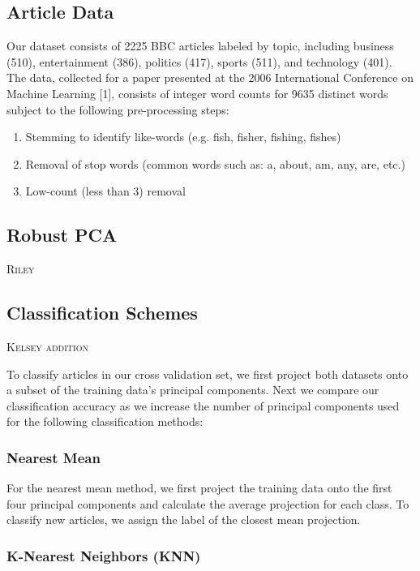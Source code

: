\documentclass[12pt]{article}
\newcommand{\comment}[1]{\textsc{\color[rgb]{1,0,0}#1}}
\begin{document}
\subsection{Article Data}

Our dataset consists of 2225 BBC articles labeled by topic, including business (510), entertainment (386), politics (417), sports (511), and technology (401). The data, collected for a paper presented at the 2006 International Conference on Machine Learning [1], consists of integer word counts for 9635 distinct words subject to the following pre-processing steps:
\begin{enumerate}
\item Stemming to identify like-words (e.g. fish, fisher, fishing, fishes)
\item Removal of stop words (common words such as: a, about, am, any, are, etc.)
\item Low-count (less than 3) removal
\end{enumerate}

\subsection{Robust PCA}
\comment{Riley}

\subsection{Classification Schemes}
\comment{Kelsey addition}

To classify articles in our cross validation set, we first project both datasets onto a subset of the training data’s principal components. Next we compare our classification accuracy as we increase the number of principal components used for the following classification methods:

\subsubsection{Nearest Mean}

For the nearest mean method, we first project the training data onto
the first four principal components and calculate the average projection for each class. To classify new articles, we assign the label of the closest mean projection.

\subsubsection{K-Nearest Neighbors (KNN)}
\end{document}
